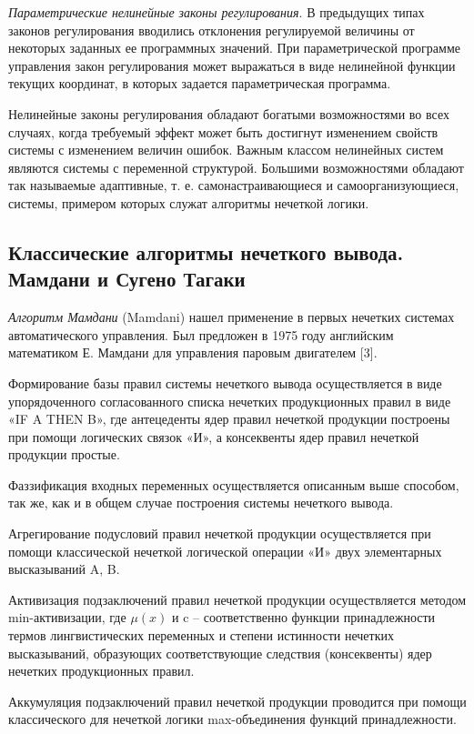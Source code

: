 \textit{Параметрические нелинейные законы регулирования}. В предыдущих типах законов регулирования вводились отклонения регулируемой величины от некоторых заданных ее программных значений. При параметрической программе управления закон регулирования может выражаться в виде нелинейной функции текущих координат, в которых задается параметрическая программа.

Нелинейные законы регулирования обладают богатыми возможностями во всех случаях, когда требуемый эффект может быть достигнут изменением свойств системы с изменением величин ошибок. Важным классом нелинейных систем являются системы с переменной структурой. Большими возможностями обладают так называемые адаптивные, т. е. самонастраивающиеся и самоорганизующиеся, системы, примером которых служат алгоритмы нечеткой логики.

\subsection{Классические алгоритмы нечеткого вывода.  Мамдани и Сугено Тагаки}
\label{sub:domain:3}


\textit{Алгоритм Мамдани }(Mamdani) нашел применение в первых нечетких системах автоматического управления. Был предложен в 1975 году английским математиком Е. Мамдани для управления паровым двигателем [3].

Формирование базы правил системы нечеткого вывода осуществляется в виде упорядоченного согласованного списка нечетких продукционных правил в виде «IF A THEN B», где антецеденты ядер правил нечеткой продукции построены при помощи логических связок «И», а консеквенты ядер правил нечеткой продукции простые.

Фаззификация входных переменных осуществляется описанным выше способом, так же, как и в общем случае построения системы нечеткого вывода.

Агрегирование подусловий правил нечеткой продукции осуществляется при помощи классической нечеткой логической операции «И» двух элементарных высказываний A, B.

Активизация подзаключений правил нечеткой продукции осуществляется методом min-активизации, где $\mu (x)$ и c – соответственно функции принадлежности термов лингвистических переменных и степени истинности нечетких высказываний, образующих соответствующие следствия (консеквенты) ядер нечетких продукционных правил.

Аккумуляция подзаключений правил нечеткой продукции проводится при помощи классического для нечеткой логики max-объединения функций принадлежности.

